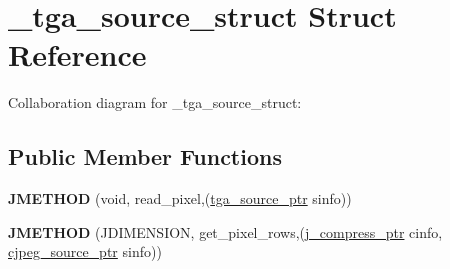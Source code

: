 \hypertarget{struct__tga__source__struct}{\section{\+\_\+tga\+\_\+source\+\_\+struct Struct Reference}
\label{struct__tga__source__struct}
}


Collaboration diagram for \+\_\+tga\+\_\+source\+\_\+struct\+:
\subsection*{Public Member Functions}
\begin{DoxyCompactItemize}
\item 
\hypertarget{struct__tga__source__struct_af4e767d93972165418c81e20f3aae269}{{\bfseries J\+M\+E\+T\+H\+O\+D} (void, read\+\_\+pixel,(\hyperlink{struct__tga__source__struct}{tga\+\_\+source\+\_\+ptr} sinfo))}\label{struct__tga__source__struct_af4e767d93972165418c81e20f3aae269}

\item 
\hypertarget{struct__tga__source__struct_a37240ee09b333afaef3ef1477607db06}{{\bfseries J\+M\+E\+T\+H\+O\+D} (J\+D\+I\+M\+E\+N\+S\+I\+O\+N, get\+\_\+pixel\+\_\+rows,(\hyperlink{structjpeg__compress__struct}{j\+\_\+compress\+\_\+ptr} cinfo, \hyperlink{structcjpeg__source__struct}{cjpeg\+\_\+source\+\_\+ptr} sinfo))}\label{struct__tga__source__struct_a37240ee09b333afaef3ef1477607db06}

\end{DoxyCompactItemize}
